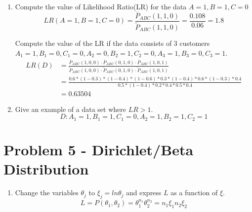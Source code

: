\documentclass[preprint,12pt]{elsarticle}
\begin{document}
\begin{enumerate}[label=\alph*]
		\item Compute the value of Likelihood Ratio(LR) for the data $A=1,B=1,C=0$
		\begin{equation*}
			LR(A=1,B=1,C=0) = \frac{\bar{P}_{ABC}(1,1,0)}{\tilde{P}_{ABC}(1,1,0)} = \frac{0.108}{0.06} = 1.8
		\end{equation*}

		Compute the value of the LR if the data consists of 3 customers 
		$A_1=1,B_1=0,C_1=0,A_2=0,B_2=1,C_2=0,A_3=1,B_3=0,C_3=1$.
		\begin{align*}
			LR(D) &= \frac{\bar{P}_{ABC}(1,0,0)\cdot \bar{P}_{ABC}(0,1,0)\cdot \bar{P}_{ABC}(1,0,1)}{\tilde{P}_{ABC}(1,0,0)\cdot \tilde{P}_{ABC}(0,1,0)\cdot \tilde{P}_{ABC}(1,0,1)}\\
			&= \frac{0.6*(1-0.3)*(1-0.4)*(1-0.6)*0.3*(1-0.4)*0.6*(1-0.3)*0.4}{0.5*(1-0.4)*0.2*0.4*0.5*0.4}\\
			&= 0.63504
		\end{align*}

		\item Give an example of a data set where $LR>1$.
		\begin{equation*}
			D:A_1=1,B_1=1,C_1=0,A_2=1,B_2=1,C_2=1
		\end{equation*}
		
	\end{enumerate}

	\section{Problem 5 - Dirichlet/Beta Distribution}
	\begin{enumerate}[label=\alph*]
		\item Change the variables $\theta_j$ to $\xi_j=ln \theta_j$ and express
		$L$ as a function of $\xi$.
		\begin{equation*}
			L = P(\theta_1,\theta_2) = \theta_1^{n_1}\theta_2^{n_2} = n_1\xi_1 n_2\xi_2
		\end{equation*}

		
	\end{enumerate}
\end{document}
